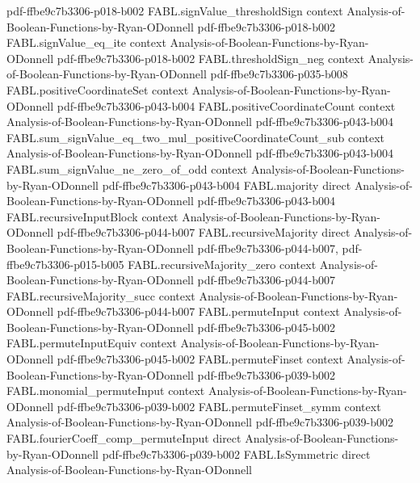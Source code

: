 \begin{theorem}
  {pdf-ffbe9c7b3306-p018-b002}
\proofstep
  {FABL.signValue_thresholdSign}
  {context}
  {Analysis-of-Boolean-Functions-by-Ryan-ODonnell}
  {pdf-ffbe9c7b3306-p018-b002}
\proofstep
  {FABL.signValue_eq_ite}
  {context}
  {Analysis-of-Boolean-Functions-by-Ryan-ODonnell}
  {pdf-ffbe9c7b3306-p018-b002}
\proofstep
  {FABL.thresholdSign_neg}
  {context}
  {Analysis-of-Boolean-Functions-by-Ryan-ODonnell}
  {pdf-ffbe9c7b3306-p035-b008}
\proofstep
  {FABL.positiveCoordinateSet}
  {context}
  {Analysis-of-Boolean-Functions-by-Ryan-ODonnell}
  {pdf-ffbe9c7b3306-p043-b004}
\proofstep
  {FABL.positiveCoordinateCount}
  {context}
  {Analysis-of-Boolean-Functions-by-Ryan-ODonnell}
  {pdf-ffbe9c7b3306-p043-b004}
\proofstep
  {FABL.sum_signValue_eq_two_mul_positiveCoordinateCount_sub}
  {context}
  {Analysis-of-Boolean-Functions-by-Ryan-ODonnell}
  {pdf-ffbe9c7b3306-p043-b004}
\proofstep
  {FABL.sum_signValue_ne_zero_of_odd}
  {context}
  {Analysis-of-Boolean-Functions-by-Ryan-ODonnell}
  {pdf-ffbe9c7b3306-p043-b004}
\proofstep
  {FABL.majority}
  {direct}
  {Analysis-of-Boolean-Functions-by-Ryan-ODonnell}
  {pdf-ffbe9c7b3306-p043-b004}
\proofstep
  {FABL.recursiveInputBlock}
  {context}
  {Analysis-of-Boolean-Functions-by-Ryan-ODonnell}
  {pdf-ffbe9c7b3306-p044-b007}
\proofstep
  {FABL.recursiveMajority}
  {direct}
  {Analysis-of-Boolean-Functions-by-Ryan-ODonnell}
  {pdf-ffbe9c7b3306-p044-b007,
    pdf-ffbe9c7b3306-p015-b005}
\proofstep
  {FABL.recursiveMajority_zero}
  {context}
  {Analysis-of-Boolean-Functions-by-Ryan-ODonnell}
  {pdf-ffbe9c7b3306-p044-b007}
\proofstep
  {FABL.recursiveMajority_succ}
  {context}
  {Analysis-of-Boolean-Functions-by-Ryan-ODonnell}
  {pdf-ffbe9c7b3306-p044-b007}
\proofstep
  {FABL.permuteInput}
  {context}
  {Analysis-of-Boolean-Functions-by-Ryan-ODonnell}
  {pdf-ffbe9c7b3306-p045-b002}
\proofstep
  {FABL.permuteInputEquiv}
  {context}
  {Analysis-of-Boolean-Functions-by-Ryan-ODonnell}
  {pdf-ffbe9c7b3306-p045-b002}
\proofstep
  {FABL.permuteFinset}
  {context}
  {Analysis-of-Boolean-Functions-by-Ryan-ODonnell}
  {pdf-ffbe9c7b3306-p039-b002}
\proofstep
  {FABL.monomial_permuteInput}
  {context}
  {Analysis-of-Boolean-Functions-by-Ryan-ODonnell}
  {pdf-ffbe9c7b3306-p039-b002}
\proofstep
  {FABL.permuteFinset_symm}
  {context}
  {Analysis-of-Boolean-Functions-by-Ryan-ODonnell}
  {pdf-ffbe9c7b3306-p039-b002}
\proofstep
  {FABL.fourierCoeff_comp_permuteInput}
  {direct}
  {Analysis-of-Boolean-Functions-by-Ryan-ODonnell}
  {pdf-ffbe9c7b3306-p039-b002}
\proofstep
  {FABL.IsSymmetric}
  {direct}
  {Analysis-of-Boolean-Functions-by-Ryan-ODonnell}

\end{theorem}
